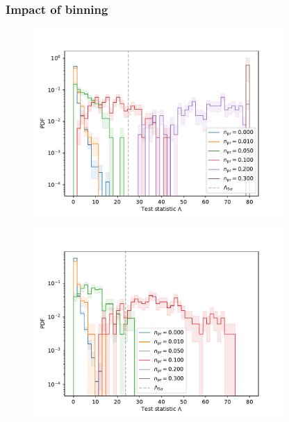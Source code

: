 \documentclass[aspectratio=1610, 9pt]{beamer}
\begin{document}
\begin{frame}
  \frametitle{Impact of binning}
  \begin{minipage}{0.49\textwidth}
    \begin{figure}
      \centering
      \includegraphics[width=0.85\textwidth]{../Plots/TS_Distribution_5e5_5bins}
    \end{figure}
  \end{minipage}
  \begin{minipage}{0.49\textwidth}
    \begin{figure}
      \centering
      \includegraphics[width=0.85\textwidth]{../Plots/TS_Distribution_5e5_6bins}
    \end{figure}
  \end{minipage}
\end{frame}
\end{document}
